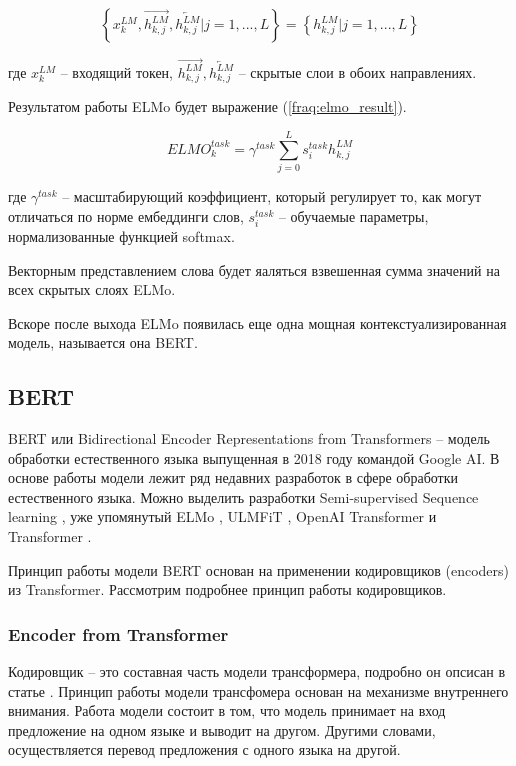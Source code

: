 \documentclass[a4paper,14pt]{article}
\begin{document}
\begin{equation}
	\left\{ x_k^{LM}, \overrightarrow{h_{k,j}^{LM}}, \overleftarrow{h_{k,j}^{LM}}  |j = 1, ...,L\right\} = 
	\left\{h_{k,j}^{LM}|j = 1, ...,L
	\right\}
	\label{fraq:array_elmo}
\end{equation}

где $x_k^{LM}$ -- входящий токен, $\overrightarrow{h_{k,j}^{LM}}, \overleftarrow{h_{k,j}^{LM}}$ -- скрытые слои в обоих направлениях.

Результатом работы ELMo будет выражение (\ref{fraq:elmo_result}).

\begin{equation}
	ELMO_k^{task} = \gamma^{task}\sum_{j=0}^{L} s_{i}^{task}h_{k,j}^{LM}
	\label{fraq:elmo_result}
\end{equation}

где $\gamma^{task}$ -- масштабирующий коэффициент, который регулирует то, как могут отличаться по норме ембеддинги слов, $s_{i}^{task}$ -- обучаемые параметры, нормализованные функцией softmax.

Векторным представлением слова будет яаляться взвешенная сумма значений на всех скрытых слоях ELMo.

Вскоре после выхода ELMo появилась еще одна мощная контекстуализированная модель, называется она BERT.

\subsection{BERT}

BERT \cite{bert1} или Bidirectional Encoder Representations from Transformers -- модель обработки естественного языка выпущенная в 2018 году командой Google AI.
В основе работы модели лежит ряд недавних разработок в сфере обработки естественного языка.
Можно выделить разработки Semi-supervised Sequence learning \cite{semi}, уже упомянутый ELMo \cite{elmo1,elmo2,elmo3}, ULMFiT \cite{ulmfit}, OpenAI Transformer \cite{transformers} и Transformer \cite{attention}.

Принцип работы модели BERT основан на применении кодировщиков (encoders) из Transformer.
Рассмотрим подробнее принцип работы кодировщиков.

\subsubsection{Encoder from Transformer}

Кодировщик -- это составная часть модели трансформера, подробно он опсисан в статье \cite{attention}.
Принцип работы модели трансфомера основан на механизме внутреннего внимания.
Работа модели состоит в том, что модель принимает на вход предложение на одном языке и выводит на другом.
Другими словами, осуществляется перевод предложения с одного языка на другой.
\end{document}
